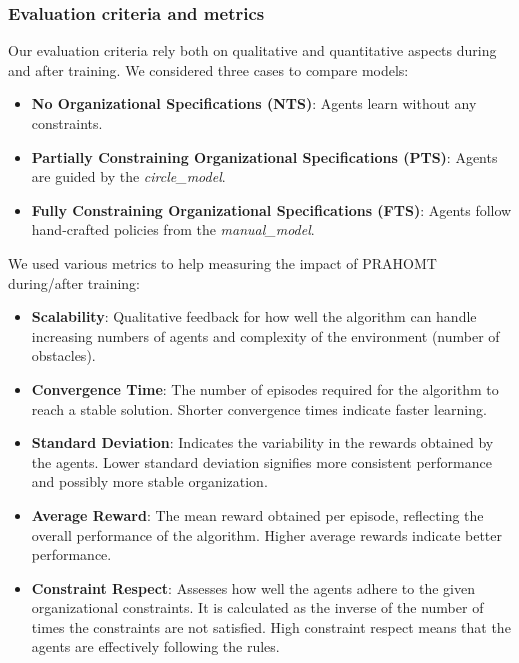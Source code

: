 \documentclass[runningheads]{llncs}
\theoremstyle{freethm}
\theoremstyle{proofoutline}
\begin{document}
\subsubsection{Evaluation criteria and metrics}

Our evaluation criteria rely both on qualitative and quantitative aspects during and after training. We considered three cases to compare models:
\begin{itemize}
    \item \textbf{No Organizational Specifications (NTS)}: Agents learn without any constraints.
    \item \textbf{Partially Constraining Organizational Specifications (PTS)}: Agents are guided by the \textit{circle\_model}.
    \item \textbf{Fully Constraining Organizational Specifications (FTS)}: Agents follow hand-crafted policies from the \textit{manual\_model}.
\end{itemize}

We used various metrics to help measuring the impact of PRAHOMT during/after training:
\begin{itemize}
    \item \textbf{Scalability}: Qualitative feedback for how well the algorithm can handle increasing numbers of agents and complexity of the environment (number of obstacles).
    \item \textbf{Convergence Time}: The number of episodes required for the algorithm to reach a stable solution. Shorter convergence times indicate faster learning.
    \item \textbf{Standard Deviation}: Indicates the variability in the rewards obtained by the agents. Lower standard deviation signifies more consistent performance and possibly more stable organization.
    \item \textbf{Average Reward}: The mean reward obtained per episode, reflecting the overall performance of the algorithm. Higher average rewards indicate better performance.
    \item \textbf{Constraint Respect}: Assesses how well the agents adhere to the given organizational constraints. It is calculated as the inverse of the number of times the constraints are not satisfied. High constraint respect means that the agents are effectively following the rules.
\end{itemize}
\end{document}
